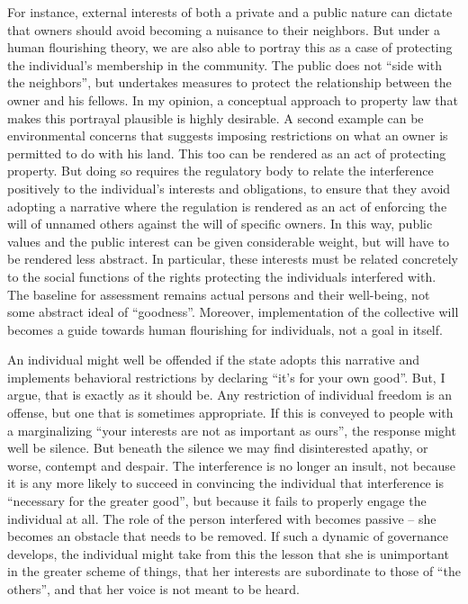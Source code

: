 For instance, external interests of both a private and a public nature can dictate that owners should avoid becoming a nuisance to their neighbors. But under a human flourishing theory, we are also able to portray this as a case of protecting the individual's membership in the community. The public does not ``side with the neighbors'', but undertakes measures to protect the relationship between the owner and his fellows. In my opinion, a conceptual approach to property law that makes this portrayal plausible is highly desirable. A second example can be environmental concerns that suggests imposing restrictions on what an owner is permitted to do with his land. This too can be rendered as an act of protecting property. But doing so requires the regulatory body to relate the interference positively to the individual's interests and obligations, to ensure that they avoid adopting a narrative where the regulation is rendered as an act of enforcing the will of unnamed others against the will of specific owners. In this way, public values and the public interest can be given considerable weight, but will have to be rendered less abstract. In particular, these interests must be related concretely to the social functions of the rights protecting the individuals interfered with. The baseline for assessment remains actual persons and their well-being, not some abstract ideal of ``goodness''. Moreover, implementation of the collective will becomes a guide towards human flourishing for individuals, not a goal in itself.

An individual might well be offended if the state adopts this narrative and implements behavioral restrictions by declaring ``it's for your own good''. But, I argue, that is exactly as it should be. Any restriction of individual freedom is an offense, but one that is sometimes appropriate. If this is conveyed to people with a marginalizing ``your interests are not as important as ours'', the response might well be silence. But beneath the silence we may find disinterested apathy, or worse, contempt and despair. The interference is no longer an insult, not because it is any more likely to succeed in convincing the individual that interference is ``necessary for the greater good'', but because it fails to properly engage the individual at all. The role of the person interfered with becomes passive -- she becomes an obstacle that needs to be removed. If such a dynamic of governance develops, the individual might take from this the lesson that she is unimportant in the greater scheme of things, that her interests are subordinate to those of ``the others'', and that her voice is not meant to be heard.


